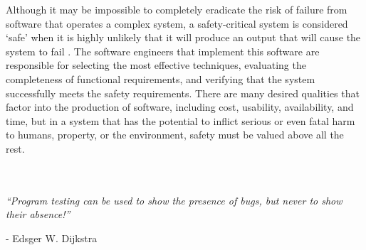 \documentclass[12pt]{article}
\begin{document}
  Although it may be impossible to completely eradicate the risk of failure from software that operates a complex system, a safety-critical system is considered `safe' when it is highly unlikely that it will produce an output that will cause the system to fail \cite{ref2}. The software engineers that implement this software are responsible for selecting the most effective techniques, evaluating the completeness of functional requirements, and verifying that the system successfully meets the safety requirements. There are many desired qualities that factor into the production of software, including cost, usability, availability, and time, but in a system that has the potential to inflict serious or even fatal harm to humans, property, or the environment, safety must be valued above all the rest.\\\\\\

  \centerline{\textit{``Program testing can be used to show the presence of bugs, but never to show their absence!''}}
  \centerline{- Edsger W. Dijkstra}
  \pagebreak

  
\end{document}
